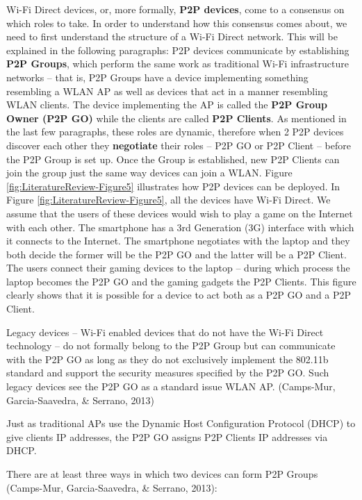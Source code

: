 \documentclass[12pt,svgnames,smaller]{article} %
\begin{document}
\begin{enumerate}
		Wi-Fi Direct devices, or, more formally, \textbf{P2P devices}, come to a consensus on which roles to take. In order to understand how this consensus comes about, we need to first understand the structure of a Wi-Fi Direct network. This will be explained in the following paragraphs:
		P2P devices communicate by establishing \textbf{P2P Groups}, which perform the same work as traditional Wi-Fi infrastructure networks – that is, P2P Groups have a device implementing something resembling a WLAN AP as well as devices that act in a manner resembling WLAN clients. The device implementing the AP is called the \textbf{P2P Group Owner (P2P GO)} while the clients are called \textbf{P2P Clients}. As mentioned in the last few paragraphs, these roles are dynamic, therefore when 2 P2P devices discover each other they \textbf{negotiate} their roles – P2P GO or P2P Client – before the P2P Group is set up. Once the Group is established, new P2P Clients can join the group just the same way devices can join a WLAN. Figure \ref{fig:LiteratureReview-Figure5} illustrates how P2P devices can be deployed. In Figure \ref{fig:LiteratureReview-Figure5}, all the devices have Wi-Fi Direct. We assume that the users of these devices would wish to play a game on the Internet with each other. The smartphone has a 3rd Generation (3G) interface with which it connects to the Internet. The smartphone negotiates with the laptop and they both decide the former will be the P2P GO and the latter will be a P2P Client. The users connect their gaming devices to the laptop – during which process the laptop becomes the P2P GO and the gaming gadgets the P2P Clients. This figure clearly shows that it is possible for a device to act both as a P2P GO and a P2P Client.
		
		Legacy devices – Wi-Fi enabled devices that do not have the Wi-Fi Direct technology – do not formally belong to the P2P Group but can communicate with the P2P GO as long as they do not exclusively implement the 802.11b standard and support the security measures specified by the P2P GO. Such legacy devices see the P2P GO as a standard issue WLAN AP. (Camps-Mur, Garcia-Saavedra, \& Serrano, 2013)
		
		Just as traditional APs use the Dynamic Host Configuration Protocol (DHCP) to give clients IP addresses, the P2P GO assigns P2P Clients IP addresses via DHCP.
		
		There are at least three ways in which two devices can form P2P Groups (Camps-Mur, Garcia-Saavedra, \& Serrano, 2013):
		

\end{enumerate}
\end{document}
